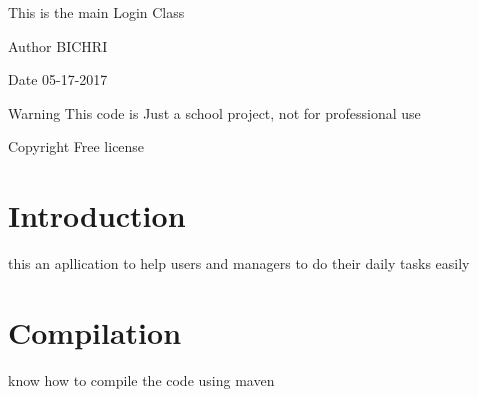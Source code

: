 This is the main Login Class\begin{DoxyAuthor}{Author}
B\+I\+C\+H\+RI
\end{DoxyAuthor}
\begin{DoxyDate}{Date}
05-\/17-\/2017
\end{DoxyDate}
\begin{DoxyWarning}{Warning}
This code is Just a school project, not for professional use
\end{DoxyWarning}
\begin{DoxyCopyright}{Copyright}
Free license
\end{DoxyCopyright}
\hypertarget{index_intro_sec}{}\section{Introduction}\label{index_intro_sec}
this an apllication to help users and managers to do their daily tasks easily\hypertarget{index_compile_sec}{}\section{Compilation}\label{index_compile_sec}
know how to compile the code using maven 